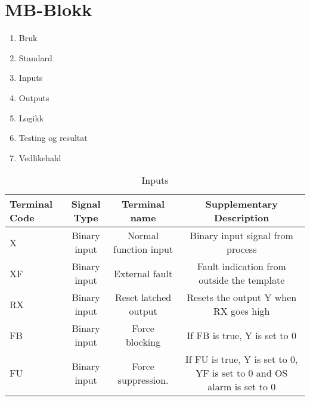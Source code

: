 \chapter{MB-Blokk}
\thispagestyle{fancy}

\begin{enumerate}
    \item Bruk
    \item Standard
    \item Inputs
    \item Outputs
    \item Logikk
    \item Testing og resultat
    \item Vedlikehald
\end{enumerate}


\begin{table}[h]
    \centering
    \begin{tabular}{|l|c|c|c|}
    \hline
        \rowcolor{myblack} %
        \textcolor{purewhite}{Terminal Code} & \textcolor{purewhite}{Signal Type} & \textcolor{purewhite}{Terminal name} & \textcolor{purewhite}{Supplementary Description}\\ \hline
        \rowcolor{lightgray}  X  & Binary input & Normal function input & Binary input signal from process \\ \hline
        \rowcolor{purewhite}  XF & Binary input & External fault & Fault indication from outside the template \\ \hline
        \rowcolor{lightgray}  RX & Binary input & Reset latched output & Resets the output Y when RX goes high \\ \hline
        \rowcolor{purewhite}  FB & Binary input & Force blocking & If FB is true, Y is set to 0 \\ \hline
        \rowcolor{lightgray}  FU & Binary input & Force suppression. & If FU is true, Y is set to 0, YF is set to 0 and OS
        alarm is set to 0 \\ \hline
    \end{tabular}
    \caption{Inputs}\label{table:MB Blokk}
\end{table}

